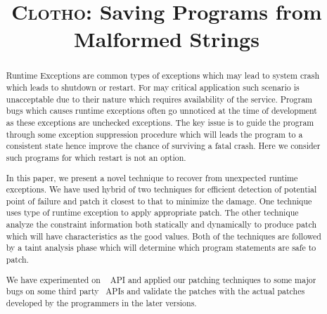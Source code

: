 \documentclass[pldi]{sigplanconf}
\def\tool{\textsc{Clotho}\xspace}
\def\papertitle{\tool: Saving Programs from Malformed Strings}
\begin{document}
\title{\Large \bf \papertitle}

\maketitle

\begin{abstract}
\small

Runtime Exceptions are common types of exceptions which may lead to system crash
which leads to shutdown or restart. For may critical application such scenario
is unacceptable due to their nature which requires availability of the service. 
Program bugs which causes runtime exceptions often go unnoticed at the time of
development as these exceptions are unchecked exceptions. The key issue is to
guide the program through some exception suppression procedure which will leads
the program to a consistent state hence improve the chance of surviving a fatal
crash. Here we consider such programs for which restart is not an option.

In this paper, we present a novel technique to recover from unexpected runtime
exceptions. We have used hybrid of two techniques for efficient detection of
potential point of failure and patch it closest to that to minimize the damage. 
One technique uses type of runtime exception to apply appropriate patch. The
other technique analyze the constraint information both statically and
dynamically to produce patch which will have characteristics as the good values.
Both of the techniques are followed by a taint analysis phase which will
determine which program statements are safe to patch.

We have experimented on \java\  API and applied our patching
techniques to some major bugs on some third party \java\ APIs and validate the
patches with the actual patches developed by the programmers in the later
versions.

\end{abstract}

% 















\raggedright
\small


\end{document}
